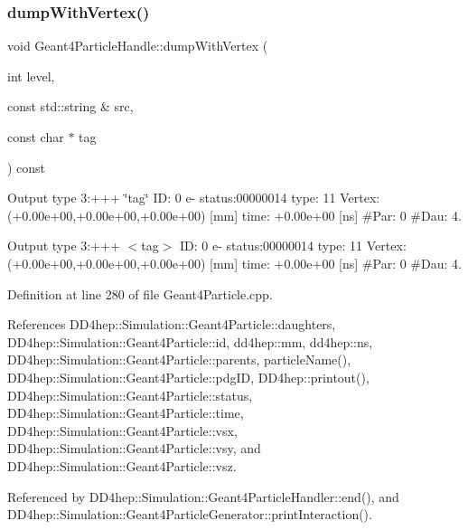 \hypertarget{class_d_d4hep_1_1_simulation_1_1_geant4_particle_handle_a1a804b13781ed8b9281883e8d36d37d9}{}\label{class_d_d4hep_1_1_simulation_1_1_geant4_particle_handle_a1a804b13781ed8b9281883e8d36d37d9} 
\subsubsection{\texorpdfstring{dump\+With\+Vertex()}{dumpWithVertex()}}
{\footnotesize\ttfamily void Geant4\+Particle\+Handle\+::dump\+With\+Vertex (\begin{DoxyParamCaption}\item[{int}]{level,  }\item[{const std\+::string \&}]{src,  }\item[{const char $\ast$}]{tag }\end{DoxyParamCaption}) const}



Output type 3\+:+++ \char`\"{}tag\char`\"{} ID\+: 0 e-\/ status\+:00000014 type\+: 11 Vertex\+:(+0.00e+00,+0.00e+00,+0.00e+00) \mbox{[}mm\mbox{]} time\+: +0.00e+00 \mbox{[}ns\mbox{]} \#Par\+: 0 \#Dau\+: 4. 

Output type 3\+:+++ $<$tag$>$ ID\+: 0 e-\/ status\+:00000014 type\+: 11 Vertex\+:(+0.00e+00,+0.00e+00,+0.00e+00) \mbox{[}mm\mbox{]} time\+: +0.00e+00 \mbox{[}ns\mbox{]} \#Par\+: 0 \#Dau\+: 4. 

Definition at line 280 of file Geant4\+Particle.\+cpp.



References D\+D4hep\+::\+Simulation\+::\+Geant4\+Particle\+::daughters, D\+D4hep\+::\+Simulation\+::\+Geant4\+Particle\+::id, dd4hep\+::mm, dd4hep\+::ns, D\+D4hep\+::\+Simulation\+::\+Geant4\+Particle\+::parents, particle\+Name(), D\+D4hep\+::\+Simulation\+::\+Geant4\+Particle\+::pdg\+ID, D\+D4hep\+::printout(), D\+D4hep\+::\+Simulation\+::\+Geant4\+Particle\+::status, D\+D4hep\+::\+Simulation\+::\+Geant4\+Particle\+::time, D\+D4hep\+::\+Simulation\+::\+Geant4\+Particle\+::vsx, D\+D4hep\+::\+Simulation\+::\+Geant4\+Particle\+::vsy, and D\+D4hep\+::\+Simulation\+::\+Geant4\+Particle\+::vsz.



Referenced by D\+D4hep\+::\+Simulation\+::\+Geant4\+Particle\+Handler\+::end(), and D\+D4hep\+::\+Simulation\+::\+Geant4\+Particle\+Generator\+::print\+Interaction().

